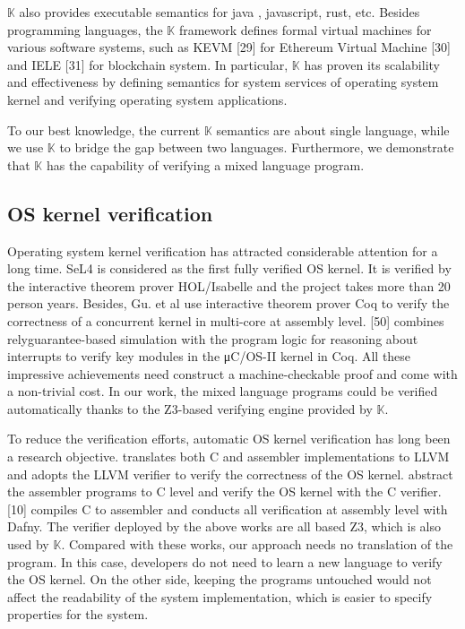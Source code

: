 \documentclass[letterpaper, 10 pt, conference]{IEEEtran}
\begin{document}
$\mathbb{K}$ also provides executable semantics for java \cite{kjava}, javascript, rust, etc. Besides programming
languages, the $\mathbb{K}$ framework defines formal virtual machines for various software systems, such as KEVM [29] for Ethereum Virtual Machine
[30] and IELE [31] for blockchain system. In particular, $\mathbb{K}$ has  proven its scalability and effectiveness by defining semantics for system services of operating system kernel and verifying operating system applications.

To our best knowledge, the current $\mathbb{K}$ semantics are about single language, while we use $\mathbb{K}$ to bridge the gap between two languages. Furthermore, we demonstrate that $\mathbb{K}$ has the capability of verifying a mixed language program.

\subsection{OS kernel verification}
Operating system kernel verification has attracted considerable
attention for a long time. SeL4 is considered as the first fully verified OS kernel. It is verified by the interactive theorem prover
HOL/Isabelle and the project takes more than 20 person years. Besides, Gu. et al use interactive theorem
prover Coq to verify the correctness of a concurrent kernel in
multi-core at assembly level. [50] combines relyguarantee-based
simulation with the program logic for reasoning
about interrupts to verify key modules in the μC/OS-II kernel
in Coq. All these impressive achievements need construct
a machine-checkable proof and come with a non-trivial cost. In our work, the mixed language programs could be verified automatically thanks to the Z3-based verifying engine provided by $\mathbb{K}$.

To reduce the verification efforts, automatic OS kernel verification has long been a research objective. \cite{hyperkernel} translates both C and assembler implementations to LLVM and adopts the LLVM verifier to verify the correctness of the OS kernel. \cite{jizheng} abstract the assembler programs to C level and verify the OS kernel with the C verifier. [10] compiles C to assembler and conducts all
verification at assembly level with Dafny. The verifier deployed by the above works are all based Z3, which is also used by $\mathbb{K}$. Compared with these works, our approach needs no translation of the program. In this case, developers do not need to learn a new language to verify the OS kernel. On the other side, keeping the programs untouched would not affect the readability of the system implementation, which is easier to specify properties for the system.
\end{document}
